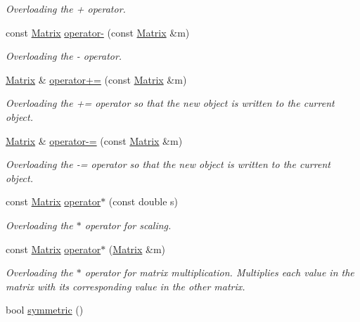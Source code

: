 \begin{DoxyCompactItemize}
\begin{DoxyCompactList}\small\item\em Overloading the + operator. \end{DoxyCompactList}\item 
const \hyperlink{class_matrix}{Matrix} \hyperlink{class_matrix_a08e75978ea8288083ef36f53b4ac115d}{operator-\/} (const \hyperlink{class_matrix}{Matrix} \&m)
\begin{DoxyCompactList}\small\item\em Overloading the -\/ operator. \end{DoxyCompactList}\item 
\hyperlink{class_matrix}{Matrix} \& \hyperlink{class_matrix_a480a72298ae1fc8443b0edfaa66d7c46}{operator+=} (const \hyperlink{class_matrix}{Matrix} \&m)
\begin{DoxyCompactList}\small\item\em Overloading the += operator so that the new object is written to the current object. \end{DoxyCompactList}\item 
\hyperlink{class_matrix}{Matrix} \& \hyperlink{class_matrix_a0e459fd035b2435ea016dc93c55ccac0}{operator-\/=} (const \hyperlink{class_matrix}{Matrix} \&m)
\begin{DoxyCompactList}\small\item\em Overloading the -\/= operator so that the new object is written to the current object. \end{DoxyCompactList}\item 
const \hyperlink{class_matrix}{Matrix} \hyperlink{class_matrix_ac4e94b307c56a15fb47a9255855f94a9}{operator$\ast$} (const double s)
\begin{DoxyCompactList}\small\item\em Overloading the $\ast$ operator for scaling. \end{DoxyCompactList}\item 
const \hyperlink{class_matrix}{Matrix} \hyperlink{class_matrix_ac396cdd2d98e1b4d99f7e17c1c26b1ec}{operator$\ast$} (\hyperlink{class_matrix}{Matrix} \&m)
\begin{DoxyCompactList}\small\item\em Overloading the $\ast$ operator for matrix multiplication. Multiplies each value in the matrix with its corresponding value in the other matrix. \end{DoxyCompactList}\item 
bool \hyperlink{class_matrix_a2df813f38f535bde8d1c8ae00b9c2eb4}{symmetric} ()

\end{DoxyCompactItemize}
